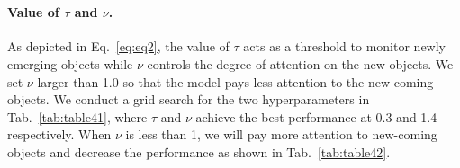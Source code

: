 \documentclass[10pt,twocolumn,letterpaper]{article}
\begin{document}
\begin{table}[t]
\vspace{-.2em}
\centering
{}
\centering
\hspace{0.5em}
\\
\centering
\caption{Grid search of $\tau$ and $\nu$ in Eq.~\ref{eq:eq2} for TAL.}
\label{tab:table4}
\end{table}


\paragraph{Value of $\tau$ and $\nu$.} As depicted in Eq.~\ref{eq:eq2}, the value of $\tau$ acts as a threshold to monitor newly emerging objects while $\nu$ controls the degree of attention on the new objects. We set $\nu$ larger than 1.0 so that the model pays less attention to the new-coming objects. We conduct a grid search for the two hyperparameters in Tab.~\ref{tab:table41}, where $\tau$ and $\nu$ achieve the best performance at 0.3 and 1.4 respectively. When $\nu$ is less than 1, we will pay more attention to new-coming objects and decrease the performance as shown in Tab.~\ref{tab:table42}.
\end{document}
